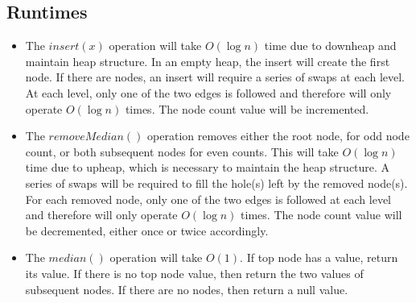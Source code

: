 \documentclass{article}
\begin{document}
\subsection*{Runtimes}
\begin{itemize}
    \item The $insert(x)$ operation will take $O(\log n)$ time due to downheap and maintain heap structure.
        In an empty heap, the insert will create the first node.
        If there are nodes, an insert will require a series of swaps at each level.
        At each level, only one of the two edges is followed and therefore will only operate $O(\log n)$ times.
        The node count value will be incremented.
    \item The $removeMedian()$ operation removes either the root node, for odd node count, or both subsequent nodes for even counts.
        This will take $O(\log n)$ time due to upheap, which is necessary to maintain the heap structure.
        A series of swaps will be required to fill the hole(s) left by the removed node(s).
        For each removed node, only one of the two edges is followed at each level and therefore will only operate $O(\log n)$ times.
        The node count value will be decremented, either once or twice accordingly.
    \item The $median()$ operation will take $O(1)$. If top node has a value, return its value.
        If there is no top node value, then return the two values of subsequent nodes.
        If there are no nodes, then return a null value.
\end{itemize}
\end{document}

